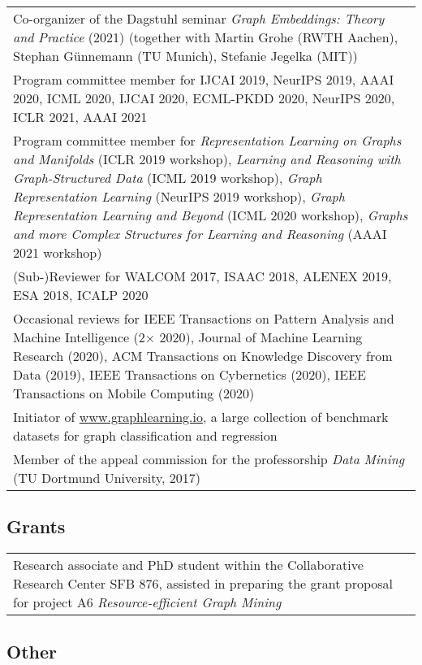 \documentclass[11pt, a4paper]{scrartcl}
\begin{document}
\begin{tabular}{p{14.5cm}}
Co-organizer of the Dagstuhl seminar \emph{Graph Embeddings: Theory and Practice} (2021) (together with Martin Grohe (RWTH Aachen), Stephan Günnemann (TU Munich), Stefanie Jegelka (MIT)) \\[0.5em]
	
Program committee member for IJCAI 2019, NeurIPS  2019, AAAI 2020, ICML 2020, IJCAI 2020, ECML-PKDD 2020,  NeurIPS 2020, ICLR 2021, AAAI 2021\\[0.5em]


Program committee member for \emph{Representation Learning on Graphs and Manifolds} (ICLR 2019 workshop), \emph{Learning and Reasoning with Graph-Structured Data} (ICML 2019 workshop), \emph{Graph Representation Learning} (NeurIPS 2019 workshop), \emph{Graph Representation Learning and Beyond} (ICML 2020 workshop), \emph{Graphs and more Complex Structures for Learning and Reasoning} (AAAI 2021 workshop)\\[0.5em]


(Sub-)Reviewer for WALCOM 2017, ISAAC 2018, ALENEX 2019, ESA 2018, ICALP 2020 \\[0.5em]

Occasional reviews for IEEE Transactions on Pattern Analysis and Machine Intelligence (2$\times$ 2020), Journal of Machine Learning Research (2020), ACM Transactions on Knowledge Discovery from Data (2019), IEEE Transactions on Cybernetics (2020), IEEE Transactions on Mobile Computing (2020)\\[0.5em]

Initiator of \url{www.graphlearning.io}, a large collection of benchmark datasets for graph classification and regression\\[0.5em]

Member of the appeal commission for the professorship \emph{Data Mining} (TU Dortmund University, 2017)
\end{tabular}

\subsection*{Grants}
\begin{tabular}{p{14.5cm}}
	Research associate and PhD student  within the Collaborative Research Center SFB 876, assisted in preparing the  grant proposal for project A6 \emph{Resource-efficient Graph Mining}
\end{tabular}


\subsection*{Other}
\end{document}
